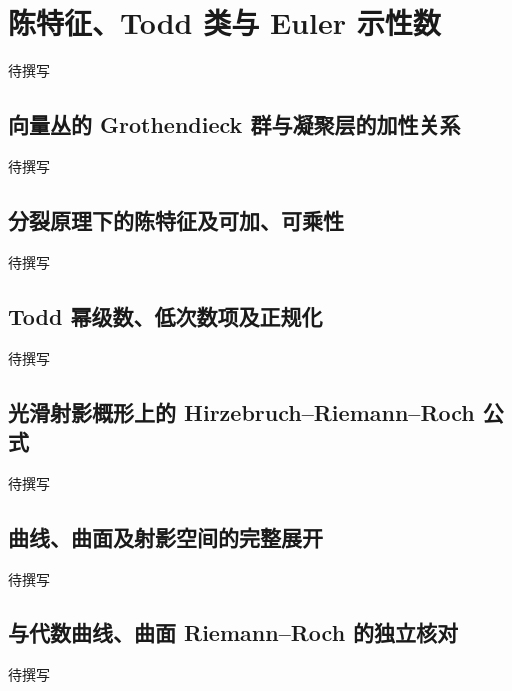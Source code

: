 
% 
% 
% 
% 
% 

\section{陈特征、Todd 类与 Euler 示性数}
\label{g5:sec:2706}

待撰写

\subsection{向量丛的 Grothendieck 群与凝聚层的加性关系}
\label{g5:subsec:2706:01}
待撰写

\subsection{分裂原理下的陈特征及可加、可乘性}
\label{g5:subsec:2706:02}
待撰写

\subsection{Todd 幂级数、低次数项及正规化}
\label{g5:subsec:2706:03}
待撰写

\subsection{光滑射影概形上的 Hirzebruch–Riemann–Roch 公式}
\label{g5:subsec:2706:04}
待撰写

\subsection{曲线、曲面及射影空间的完整展开}
\label{g5:subsec:2706:05}
待撰写

\subsection{与代数曲线、曲面 Riemann–Roch 的独立核对}
\label{g5:subsec:2706:06}
待撰写
